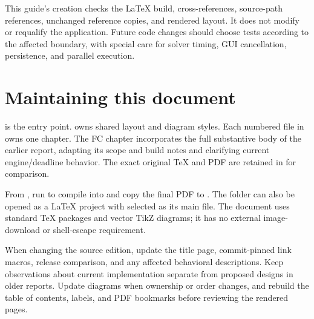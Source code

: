 This guide's creation checks the LaTeX build, cross-references, source-path references, unchanged reference copies, and rendered layout. It does not modify or requalify the application. Future code changes should choose tests according to the affected boundary, with special care for solver timing, GUI cancellation, persistence, and parallel execution.

\section{Maintaining this document}
 is the entry point.  owns shared layout and diagram styles. Each numbered file in  owns one chapter. The FC chapter incorporates the full substantive body of the earlier report, adapting its scope and build notes and clarifying current engine/deadline behavior. The exact original TeX and PDF are retained in  for comparison.

From , run  to compile into  and copy the final PDF to . The folder can also be opened as a LaTeX project with  selected as its main file. The document uses standard TeX packages and vector TikZ diagrams; it has no external image-download or shell-escape requirement.

When changing the source edition, update the title page, commit-pinned link macros, release comparison, and any affected behavioral descriptions. Keep observations about current implementation separate from proposed designs in older reports. Update diagrams when ownership or order changes, and rebuild the table of contents, labels, and PDF bookmarks before reviewing the rendered pages.
